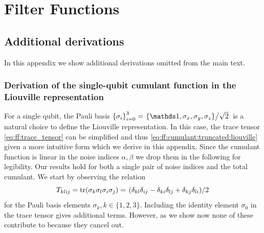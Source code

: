 \setchapterpreamble[u]{\margintoc}
\chapter{Filter Functions}\label{ch:app:ff}
\section{Additional derivations}\label{sec:app:ff:derivations:cumulant:pauli}
In this appendix we show additional derivations omitted from the main text.
\subsection{Derivation of the single-qubit cumulant function in the Liouville representation}
For a single qubit, the Pauli basis $\left\lbrace\sigma_i\right\rbrace_{i=0}^3 = \flatfrac{\left\lbrace\eye,\sx,\sy,\sz\right\rbrace}{\sqrt{2}}$ is a natural choice to define the Liouville representation.
In this case, the trace tensor \cref{eq:ff:trace_tensor} can be simplified and thus \cref{eq:ff:cumulant:truncated:liouville} given a more intuitive form which we derive in this appendix.
Since the cumulant function is linear in the noise indices $\alpha,\beta$ we drop them in the following for legibility.
Our results hold for both a single pair of noise indices and the total cumulant.
We start by observing the relation
\begin{equation}\label{eq:ff:trace_tensor:four_paulis}
    T_{klij} = \tr(\sigma_k\sigma_l\sigma_i\sigma_j) = \flatfrac{(\delta_{kl}\delta_{ij} - \delta_{ki}\delta_{lj} + \delta_{kj}\delta_{li})}{2}
\end{equation}
for the Pauli basis elements $\sigma_k, k\in\lbrace 1, 2, 3\rbrace$.
Including the identity element $\sigma_0$ in the trace tensor gives additional terms.
However, as we show now none of these contribute to \cumulantfun because they cancel out.


